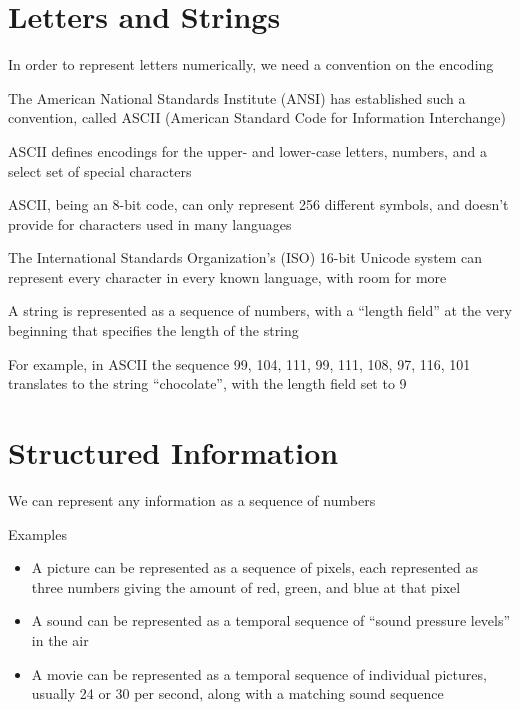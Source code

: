 \documentclass[8pt,a4paper,compress]{beamer}
\begin{document}
\section{Letters and Strings}
\begin{frame}[fragile]
\pause

In order to represent letters numerically, we need a convention on the encoding

\pause
\bigskip

The American National Standards Institute (ANSI) has established such a convention, called ASCII (American Standard Code for Information Interchange)

\pause
\bigskip

ASCII defines encodings for the upper- and lower-case letters, numbers, and a select set of special characters

\pause
\bigskip

ASCII, being an 8-bit code, can only represent 256 different symbols, and doesn't provide for characters used in many languages

\pause
\bigskip

The International Standards Organization's (ISO) 16-bit Unicode system can represent every character in every known language, with room for more
\end{frame}

\begin{frame}[fragile]
\pause

A string is represented as a sequence of numbers, with a ``length field'' at the very beginning that specifies the length of the string

\pause
\bigskip

For example, in ASCII the sequence 99, 104, 111, 99, 111, 108, 97, 116, 101 translates to the string ``chocolate'', with the length field set to 9
\end{frame}

\section{Structured Information}
\begin{frame}[fragile]
\pause

We can represent any information as a sequence of numbers

\pause
\bigskip

Examples
\begin{itemize}
\pause
\item A picture can be represented as a sequence of pixels, each represented as three numbers giving the amount of red, green, and blue at that pixel

\pause
\item A sound can be represented as a temporal sequence of ``sound pressure levels'' in the air

\pause
\item A movie can be represented as a temporal sequence of individual pictures, usually 24 or 30 per second, along with a matching sound sequence
\end{itemize}
\end{frame}
\end{document}
